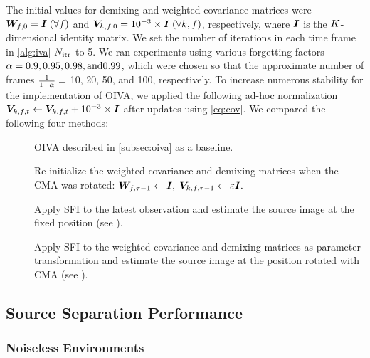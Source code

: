 \documentclass[sip,biber]{now-journal}
\begin{document}
The initial values for demixing and weighted covariance matrices were
$\bm{W} _{f,0} = \bm{I}\; (\forall f)$ and $\bm{V} _{k,f,0} = 10^{-3} \times \bm{I}\; (\forall k, f)$, respectively, where $\bm{I}$ is the $K$-dimensional identity matrix.
We set the number of iterations in each time frame in \cref{alg:iva} $N _{\mathrm{itr}}$ to 5.
We ran experiments using various forgetting factors $\alpha = 0.9, 0.95, 0.98, \text{and} 0.99$,
which were chosen so that the approximate number of frames $\frac{1}{1 - \alpha} =$ 10, 20, 50, and 100, respectively.
To increase numerous stability for the implementation of OIVA,
we applied the following ad-hoc normalization $\cov _{\src,\ft} \gets \cov _{\src,\ft} + 10 ^{-3} \times \Eye$ after updates using \eqref{eq:cov}.
We compared the following four methods:
\begin{description}
  \item[\NaiveIVA] OIVA described in \cref{subsec:oiva} as a baseline.
  \item[\ResetIVA] Re-initialize the weighted covariance and demixing matrices when the CMA was rotated:
      $\bm{W} _{f,\tau - 1} \gets \bm{I}, \; \bm{V} _{k,f,\tau - 1} \gets \varepsilon \bm{I}.$
  \item[\SFIIVAo] Apply SFI to the latest observation and estimate the source image at the fixed position (see ).
  \item[\SFIIVAm] Apply SFI to the weighted covariance and demixing matrices as parameter transformation and estimate the source image at the position rotated with CMA (see ).
\end{description}

\subsection{Source Separation Performance}
\subsubsection{Noiseless Environments}
\end{document}
